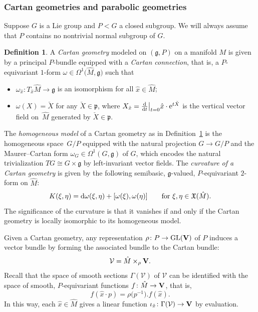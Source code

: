 \documentclass[10pt,a4paper]{amsart}
\numberwithin{equation}{section}
\theoremstyle{definition}
\newtheorem{defin}[thm]{Definition}
\def\g{{\mathfrak g}}
\def\p{{\mathfrak p}}
\begin{document}
\subsubsection{Cartan geometries and parabolic geometries}
Suppose $G$ is a Lie group and $P<G$ a closed subgroup. We will always assume that $P$ contains no nontrivial normal subgroup of $G$.
\begin{defin}
 \label{defin.cartan.geom}
 A \emph{Cartan geometry} modeled on $(\g, P)$ on a manifold $M$ is given by a principal $P$-bundle  equipped with a
 \emph{Cartan connection}, that is, a $P$-equivariant $1$-form ${\omega\in\Omega^1\bigl(\hat{M},\g\bigr)}$ such that
 \begin{itemize}\itemsep=0pt
 \item $\omega_{\hat{x}}\colon T_{\hat{x}} \hat{M}\rightarrow \g$ is an isomorphism for all $\hat{x}\in \hat{M}$;
 \item $\omega(X)= \check{X}$ for any $\check{X}\in \p$,
 where $X_{\hat{x}}= \frac{{\rm d}}{{\rm d}t}\big|_{t=0 } \hat{x}\cdot {\rm e}^{t \check{X}}$ is the vertical vector field on~$\hat{M}$ generated by $\check{X}\in\p$.
 \end{itemize}
 \end{defin}
 The \emph{homogeneous model} of a Cartan geometry as in Definition~\ref{defin.cartan.geom} is the homogeneous space~$G/P$ equipped with the natural projection $G\rightarrow G/P$ and
 the Maurer--Cartan form ${\omega_G\in\Omega^1(G,\g)}$ of $G$, which encodes the natural trivialization $TG\cong G\times\g$ by left-invariant vector fields.
 The \emph{curvature of a Cartan geometry} is given by the following semibasic, $\g$-valued, $P$-equivariant $2$-form on $\hat{M}$:
 \begin{equation*}
 K(\xi,\eta)={\rm d}\omega(\xi,\eta)+[\omega(\xi), \omega(\eta)] \qquad\textrm{for } \xi,\eta\in\mathfrak X(\hat{M}).
 \end{equation*}
 The significance of the curvature is that it vanishes if and only if the Cartan geometry is locally isomorphic to its homogeneous model.

 Given a Cartan geometry, any representation $\rho\colon P\rightarrow\textrm{GL}({\bf V})$ of $P$ induces
 a vector bundle by forming the associated bundle to the Cartan bundle:
 \[
 \mathcal V =\hat{M} \times_\rho {\bf V}.
 \]
 Recall that the space of smooth sections $\Gamma(\mathcal V)$ of $\mathcal V$ can be identified with the space  of smooth, $P$-equivariant functions $f\colon \hat{M}\rightarrow {\bf V}$, that is,
 \[f(\hat{x}\cdot p)= {\rho\bigl(p^{-1}\bigr). f(\hat{x})}.\]
 In this way, each $\hat{x} \in \hat{M}$ gives a linear function $\iota_{\hat{x}}\colon \Gamma(\mathcal{V}) \rightarrow {\bf V}$ by evaluation.
\end{document}
